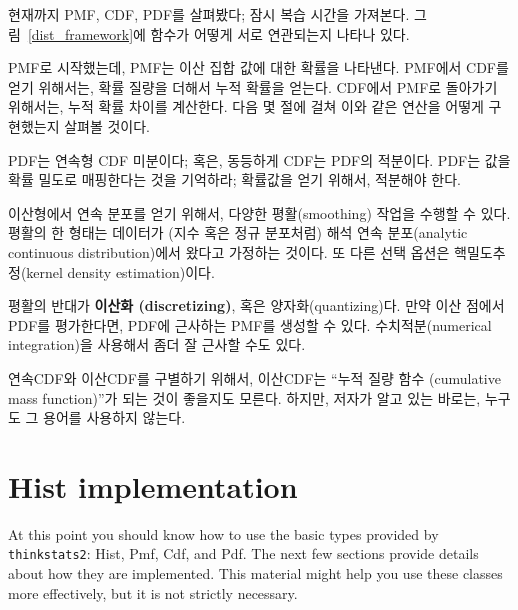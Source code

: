 현재까지 PMF, CDF, PDF를 살펴봤다; 잠시 복습 시간을 가져본다.
그림~\ref{dist_framework}에 함수가 어떻게 서로 연관되는지 나타나 있다.

PMF로 시작했는데, PMF는 이산 집합 값에 대한 확률을 나타낸다.
PMF에서 CDF를 얻기 위해서는, 확률 질량을 더해서 누적 확률을 얻는다.
CDF에서 PMF로 돌아가기 위해서는, 누적 확률 차이를 계산한다.
다음 몇 절에 걸쳐 이와 같은 연산을 어떻게 구현했는지 살펴볼 것이다.

PDF는 연속형 CDF 미분이다; 혹은, 동등하게 CDF는 PDF의 적분이다.
PDF는 값을 확률 밀도로 매핑한다는 것을 기억하라; 확률값을 얻기 위해서,
적분해야 한다.


이산형에서 연속 분포를 얻기 위해서, 다양한 평활(smoothing) 작업을 수행할 수 있다.
평활의 한 형태는 데이터가 (지수 혹은 정규 분포처럼) 
해석 연속 분포(analytic continuous distribution)에서 왔다고 가정하는 것이다.
또 다른 선택 옵션은 핵밀도추정(kernel density estimation)이다.


평활의 반대가 {\bf 이산화 (discretizing)}, 혹은 양자화(quantizing)다.
만약 이산 점에서 PDF를 평가한다면, PDF에 근사하는 PMF를 생성할 수 있다.
수치적분(numerical integration)을 사용해서 좀더 잘 근사할 수도 있다.

연속CDF와 이산CDF를 구별하기 위해서, 이산CDF는 
``누적 질량 함수 (cumulative mass function)''가 되는 것이 좋을지도 모른다.
하지만, 저자가 알고 있는 바로는, 누구도 그 용어를 사용하지 않는다.



\section{Hist implementation}

At this point you should know how to use the basic types provided
by {\tt thinkstats2}: Hist, Pmf, Cdf, and Pdf.  The next few sections
provide details about how they are implemented.  This material
might help you use these classes more effectively, but it is not
strictly necessary.

